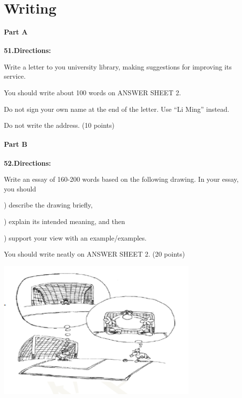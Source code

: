 \section{Writing}
\paragraph{Part A}

\textbf{51.Directions:}

\qquad Write a letter to you university library, making suggestions for improving its service.

\qquad You should write about 100 words on ANSWER SHEET 2.

\qquad Do not sign your own name at the end of the letter. Use “Li Ming” instead.

\qquad Do not write the address. (10 points)

\paragraph{Part B}

\textbf{52.Directions:}

\qquad Write an essay of 160-200 words based on the following drawing. In your essay, you should

) describe the drawing briefly,

) explain its intended meaning, and then

) support your view with an example/examples.

\qquad You should write neatly on ANSWER SHEET 2. (20 points)

\begin{center}\includegraphics[height=7cm]{8.png}\end{center}